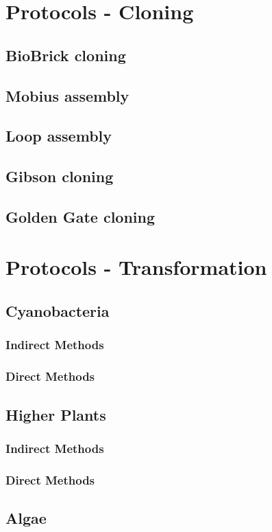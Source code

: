\printbibliography

\chapter{Protocols - Cloning}
\section{BioBrick cloning}
\section{Mobius assembly}
\section{Loop assembly}
\section{Gibson cloning}
\section{Golden Gate cloning}


\chapter{Protocols - Transformation}
\section{Cyanobacteria}
\subsection{Indirect Methods}
\subsection{Direct Methods}
\section{Higher Plants}
\subsection{Indirect Methods}
\subsection{Direct Methods}
\section{Algae}
